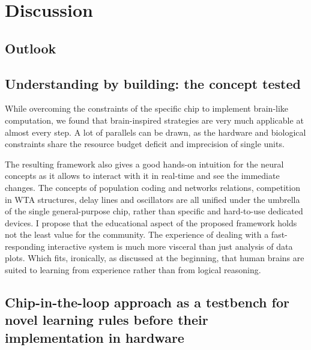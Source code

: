 \chapter{Discussion}
\label{ch:discussion}



\section{Outlook}




\section{Understanding by building: the concept tested}

While overcoming the constraints of the specific chip to implement brain-like computation, we found that brain-inspired strategies are very much applicable at almost every step. A lot of parallels can be drawn, as the hardware and biological constraints share the resource budget deficit and imprecision of single units.

The resulting framework also gives a good hands-on intuition for the neural concepts as it allows to interact with it in real-time and see the immediate changes. The concepts of population coding and networks relations, competition in \ac{WTA} structures, delay lines and oscillators are all unified under the umbrella of the single general-purpose chip, rather than specific and hard-to-use dedicated devices. I propose that the educational aspect of the proposed framework holds not the least value for the community. The experience of dealing with a fast-responding interactive system is much more visceral than just analysis of data plots. Which fits, ironically, as discussed at the beginning, that human brains are suited to learning from experience rather than from logical reasoning.

\section{Chip-in-the-loop approach as a testbench for novel learning rules before their implementation in hardware}

